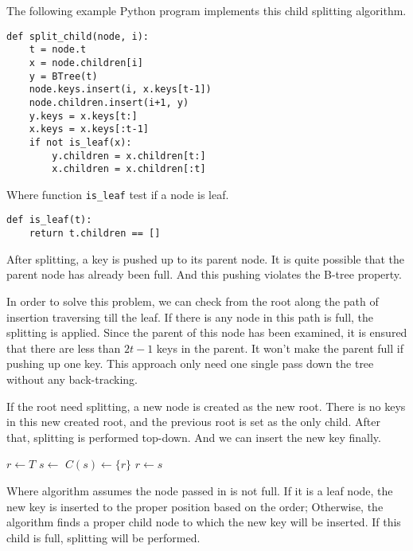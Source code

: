 \documentclass{article}
\begin{document}
The following example Python program implements this child splitting algorithm.

\lstset{language=Python}
\begin{lstlisting}
def split_child(node, i):
    t = node.t
    x = node.children[i]
    y = BTree(t)
    node.keys.insert(i, x.keys[t-1])
    node.children.insert(i+1, y)
    y.keys = x.keys[t:]
    x.keys = x.keys[:t-1]
    if not is_leaf(x):
        y.children = x.children[t:]
        x.children = x.children[:t]
\end{lstlisting}

Where function \texttt{is\_leaf} test if a node is leaf.

\lstset{language=Python}
\begin{lstlisting}
def is_leaf(t):
    return t.children == []
\end{lstlisting}


After splitting, a key is pushed up to its parent node.
It is quite possible that the parent node has already been full.
And this pushing violates the B-tree property.

In order to solve this problem, we can check from the root along
the path of insertion traversing till the leaf. If there is any node
in this path is full, the splitting is applied. Since the parent
of this node has been examined, it is ensured that there are
less than $2t-1$ keys in the parent. It won't make the
parent full if pushing up one key. This approach only need one single
pass down the tree without any back-tracking.

If the root need splitting, a new node is created as the new root.
There is no keys in this new created root, and the previous root is
set as the only child. After that, splitting is performed top-down.
And we can insert the new key finally.

\begin{algorithmic}[1]
  \State $r \gets T$
   
    \State $s \gets$ 
    \State $C(s) \gets \{r\}$
    \State {}
    \State $r \gets s$
  \EndIf
  \State \Return {}
\EndFunction
\end{algorithmic}

Where algorithm  assumes the node passed in
is not full. If it is a leaf node, the new key is inserted to
the proper position based on the order; Otherwise, the algorithm
finds a proper child node to which the new key will be inserted.
If this child is full, splitting will be performed.
\end{document}
